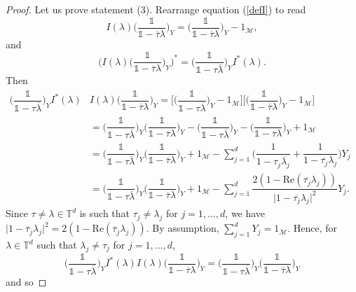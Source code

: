 \documentclass[11pt, reqno]{amsart}
\newcommand\1{\boldsymbol {1}}
\numberwithin{equation}{section}
\begin{document}
\begin{proof}
Let us prove statement (3). Rearrange equation (\ref{defI}) to read
$$I(\lambda)\Big(\dfrac{\mathds{1}}{\mathds{1}-\overline{\tau}\lambda}\Big)_{Y} = \Big(\dfrac{\mathds{1}}{\mathds{1}-\overline{\tau}\lambda}\Big)_{Y} - 1_{\mathcal{M}},$$
and
$$\bigg(I(\lambda)\Big(\dfrac{\mathds{1}}{\mathds{1}-\overline{\tau}\lambda}\Big)_{Y}\bigg)^{*} = \Big(\dfrac{\mathds{1}}{\mathds{1}-\tau\overline{\lambda}}\Big)_{Y}I^{*}(\lambda).$$
Then 
\begin{align*}\Big(\dfrac{\mathds{1}}{\mathds{1}-\tau\overline{\lambda}}\Big)_{Y}I^{*}(\lambda)&I(\lambda)\Big(\dfrac{\mathds{1}}{\mathds{1}-\overline{\tau}\lambda}\Big)_{Y} = \bigg[\Big(\dfrac{\mathds{1}}{\mathds{1}-\tau\overline{\lambda}}\Big)_{Y}-1_{\mathcal{M}}\bigg]\bigg[\Big(\dfrac{\mathds{1}}{\mathds{1}-\overline{\tau}\lambda}\Big)_{Y}-1_{\mathcal{M}}\bigg]\\
    & = \Big(\dfrac{\mathds{1}}{\mathds{1}-\tau\overline{\lambda}}\Big)_{Y}\Big(\dfrac{\mathds{1}}{\mathds{1}-\overline{\tau}\lambda}\Big)_{Y}-\Big(\dfrac{\mathds{1}}{\mathds{1}-\tau\overline{\lambda}}\Big)_{Y}-\Big(\dfrac{\mathds{1}}{\mathds{1}-\overline{\tau}\lambda}\Big)_{Y}+1_{\mathcal{M}} \hspace{5cm}\\
    & = \Big(\dfrac{\mathds{1}}{\mathds{1}-\tau\overline{\lambda}}\Big)_{Y}\Big(\dfrac{\mathds{1}}{\mathds{1}-\overline{\tau}\lambda}\Big)_{Y} + 1_{\mathcal{M}} - \sum_{j=1}^{d}\bigg(\dfrac{1}{1-\tau_{j}\overline{\lambda_{j}}}+\dfrac{1}{1-\overline{\tau_{j}}\lambda_{j}}\bigg)Y_{j}\\
    & = \Big(\dfrac{\mathds{1}}{\mathds{1}-\tau\overline{\lambda}}\Big)_{Y}\Big(\dfrac{\mathds{1}}{\mathds{1}-\overline{\tau}\lambda}\Big)_{Y} + 1_{\mathcal{M}} - \sum_{j=1}^{d}\dfrac{2(1-\mathrm{Re}(\overline{\tau_{j}}\lambda_{j}))}{\lvert 1-\overline{\tau_{j}}\lambda_{j}\rvert^{2}}Y_{j}.
\end{align*}
Since $\tau\neq\lambda\in\mathbb{T}^{d}$ is such that $\tau_{j}\neq\lambda_{j}$ for $j=1,\hdots,d$, we have $\lvert 1-\overline{\tau}_{j}\lambda_{j}\rvert^{2}=2(1-\mathrm{Re}(\overline{\tau}_{j}\lambda_{j}))$. By assumption, $\sum_{j=1}^{d}Y_{j}=1_{\mathcal{M}}$. Hence, for $\lambda\in\mathbb{T}^{d}$ such that $\lambda_{j} \neq \tau_{j}$ for $j=1,\hdots,d$,
$$\Big(\dfrac{\mathds{1}}{\mathds{1}-\tau\overline{\lambda}}\Big)_{Y}I^{*}(\lambda)I(\lambda)\Big(\dfrac{\mathds{1}}{\mathds{1}-\overline{\tau}\lambda}\Big)_{Y} = \Big(\dfrac{\mathds{1}}{\mathds{1}-\tau\overline{\lambda}}\Big)_{Y}\Big(\dfrac{\mathds{1}}{\mathds{1}-\overline{\tau}\lambda}\Big)_{Y}$$
and so

\end{proof}
\end{document}
